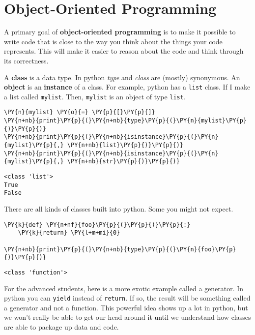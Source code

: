\chapter{Object-Oriented Programming}


A primary goal of \textbf{object-oriented programming} is to make it possible to write code that is close to the way you think about the things your code represents.
This will make it easier to reason about the code and think through its correctness.


A \textbf{class} is a data type.  In python \emph{type} and \emph{class} are (mostly) synonymous.  An \textbf{object} is an \textbf{instance} of a class.  For example, python has a \texttt{list} class.  If I make a list called \texttt{mylist}.  Then, \texttt{mylist} is an object of type \texttt{list}.  


\begin{Verbatim}[commandchars=\\\{\}]
\PY{n}{mylist} \PY{o}{=} \PY{p}{[}\PY{p}{]}
\PY{n+nb}{print}\PY{p}{(}\PY{n+nb}{type}\PY{p}{(}\PY{n}{mylist}\PY{p}{)}\PY{p}{)}
\PY{n+nb}{print}\PY{p}{(}\PY{n+nb}{isinstance}\PY{p}{(}\PY{n}{mylist}\PY{p}{,} \PY{n+nb}{list}\PY{p}{)}\PY{p}{)}
\PY{n+nb}{print}\PY{p}{(}\PY{n+nb}{isinstance}\PY{p}{(}\PY{n}{mylist}\PY{p}{,} \PY{n+nb}{str}\PY{p}{)}\PY{p}{)}
\end{Verbatim}

\begin{Verbatim}
<class 'list'>
True
False
\end{Verbatim}


There are all kinds of classes built into python.  Some you might not expect.


\begin{Verbatim}[commandchars=\\\{\}]
\PY{k}{def} \PY{n+nf}{foo}\PY{p}{(}\PY{p}{)}\PY{p}{:}
    \PY{k}{return} \PY{l+m+mi}{0}

\PY{n+nb}{print}\PY{p}{(}\PY{n+nb}{type}\PY{p}{(}\PY{n}{foo}\PY{p}{)}\PY{p}{)}
\end{Verbatim}

\begin{Verbatim}
<class 'function'>
\end{Verbatim}


For the advanced students, here is a more exotic example called a generator.  In python you can \texttt{yield} instead of \texttt{return}.  If so, the result will be something called a generator and not a function.  This powerful idea shows up a lot in python, but we won't really be able to get our head around it until we understand how classes are able to package up data and code.  



